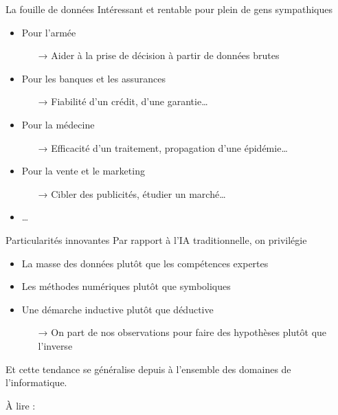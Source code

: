 \documentclass[xcolor={svgnames}, french]{beamer}
\begin{document}
\begin{frame}{La fouille de données}
	Intéressant et rentable pour plein de gens sympathiques
	\begin{itemize}
		\item Pour l'armée
			\begin{itemize}
				\item[→] Aider à la \alert{prise de décision} à partir de données brutes
			\end{itemize}
		\item Pour les banques et les assurances
			\begin{itemize}
				\item[→] Fiabilité d'un crédit, d'une garantie…
			\end{itemize}
		\item Pour la médecine
			\begin{itemize}
				\item[→] Efficacité d'un traitement, propagation d'une épidémie…
			\end{itemize}
		\item Pour la vente et le marketing
			\begin{itemize}
				\item[→] \alert{Cibler} des publicités, étudier un marché…
			\end{itemize}
		\item …
	\end{itemize}
\end{frame}

\begin{frame}{Particularités innovantes}
	Par rapport à l'IA traditionnelle, on privilégie
	\begin{itemize}
		\item \alert{La masse des données} plutôt que les compétences expertes
		\item \alert{Les méthodes numériques} plutôt que symboliques
		\item Une démarche \alert{inductive} plutôt que déductive
			\begin{itemize}
				\item[→] On part de nos observations pour faire des hypothèses plutôt que l'inverse
			\end{itemize}

	\end{itemize}
	Et cette tendance se généralise depuis à l'ensemble des domaines de l'informatique.

	À lire :  \parencite{church2011PendulumSwungToo}
\end{frame}
\end{document}
